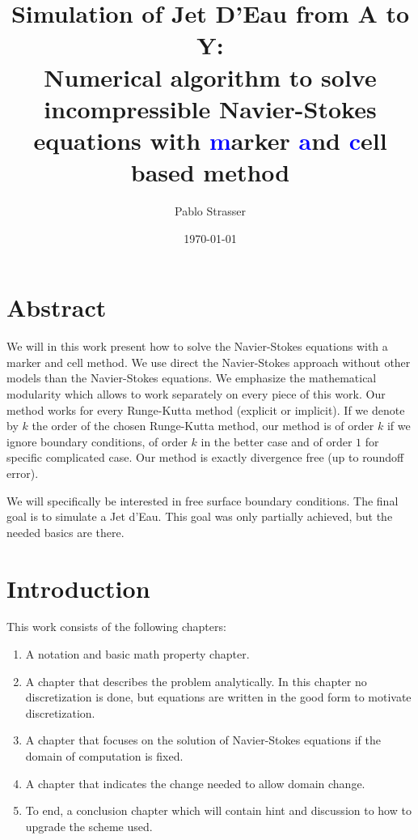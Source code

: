 \documentclass[a4paper]{master}
\title{Simulation of Jet D'Eau from A to Y:\\ Numerical algorithm to solve incompressible Navier-Stokes equations
with \textcolor{blue}{m}arker \textcolor{blue}{a}nd \textcolor{blue}{c}ell based method}
\author{Pablo Strasser}
\date{\today}
\begin{document}
\captionsetup{singlelinecheck=off,margin=10pt,font=small,labelfont=bf}
\maketitle
\dominitoc

\chapter*{Abstract}

\mtcaddchapter[Abstract]

We will in this work present how to solve the Navier-Stokes equations with a marker and cell method.
We use direct the Navier-Stokes approach without other models than the Navier-Stokes equations.
We emphasize the mathematical modularity which allows to work separately on every piece of this work.
Our method works for every Runge-Kutta method (explicit or implicit). If we denote by $k$ the order of the chosen Runge-Kutta method,
our method is of order $k$ if we ignore boundary conditions, of order $k$ in the better case and of order $1$ for specific complicated case.
Our method is exactly divergence free (up to roundoff error).

We will specifically be interested in free surface boundary conditions. The final goal is to simulate a Jet d'Eau.
This goal was only partially achieved, but the needed basics are there. 


\tableofcontents

\chapter*{Introduction}

\mtcaddchapter[Introduction]

This work consists of the following chapters:
\begin{enumerate}
 \item A notation and basic math property chapter.
 \item A chapter that describes the problem analytically. In this chapter no discretization is done, but equations are written in the good form to motivate discretization.
 \item A chapter that focuses on the solution of Navier-Stokes equations if the domain of computation is fixed.
 \item A chapter that indicates the change needed to allow domain change.
 \item To end, a conclusion chapter which will contain hint and discussion to how to upgrade the scheme used.
\end{enumerate}
\end{document}
